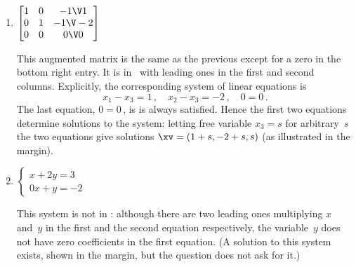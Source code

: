 \begin{example}
\begin{enumerate}
\item \(\begin{bmatrix} 1&0&-1\V1
\\0&1&-1\V-2
\\0&0&0\V0
\end{bmatrix}\)
\begin{solution} 
This augmented matrix is the same as the previous except for a zero in the bottom right entry. 
It is in \rref\ with leading ones in the first and second columns.
%
Explicitly, the corresponding system of linear equations is
\begin{equation*}
x_1-x_3=1\,,\quad x_2-x_3=-2\,,\quad 0=0\,.
\end{equation*}
The last equation, \(0=0\)\,, is is always satisfied.
Hence the first two equations determine solutions to the system: letting free variable \(x_3=s\) for arbitrary~\(s\) the two equations give solutions \(\xv=(1+s,-2+s,s)\) (as illustrated in the margin).
\end{solution}

\item \(\begin{cases} x+2y=3\\ 0x+y=-2
\end{cases}\)
\begin{solution} 
This system is not in \rref: 
%
although there are two leading ones multiplying \(x\) and~\(y\) in the first and the second equation respectively, the variable~\(y\) does not have zero coefficients in the first equation.  
(A solution to this system exists, shown  in the margin, but the question does not ask for it.)
\end{solution}


\end{enumerate}
\end{example}
